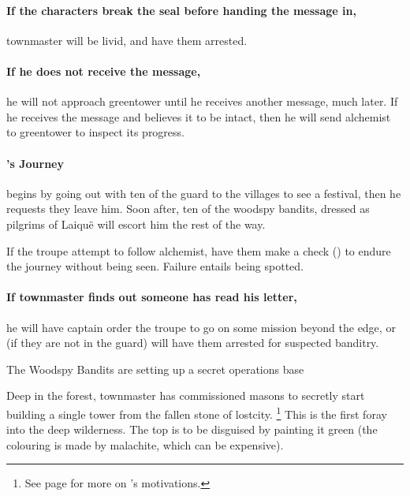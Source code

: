\paragraph{If the characters break the seal before handing the message in,} \gls{townmaster} will be livid, and have them arrested.

\paragraph{If he does not receive the message,}
he will not approach \gls{greentower} until he receives another message, much later.
If he receives the message and believes it to be intact, then he will send \gls{alchemist} to \gls{greentower} to inspect its progress.

\paragraph{'s Journey}
begins by going out with ten of the \gls{guard} to the \glspl{village} to see a festival, then he requests they leave him.
Soon after, ten of the woodspy bandits, dressed as pilgrims of Laiqu\"e will escort him the rest of the way.

If the troupe attempt to follow \gls{alchemist}, have them make a  check (\tn[9]) to endure the journey without being seen.
Failure entails being spotted.

\paragraph{If \gls{townmaster} finds out someone has read his letter,}
he will have \gls{captain} order the troupe to go on some mission beyond the \gls{edge}, or (if they are not in the \gls{guard}) will have them arrested for suspected banditry.


{}%
{The Woodspy Bandits are setting up a secret operations base}%

Deep in the forest, \gls{townmaster} has commissioned masons to secretly start building a single tower from the fallen stone of \gls{lostcity}.
\footnote{See page \pageref{expanding_wilderness} for more on 's motivations.}
This is the first foray into the deep wilderness.
The top is to be disguised by painting it green (the colouring is made by malachite, which can be expensive).


